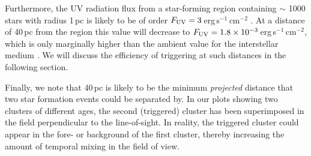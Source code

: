 \documentclass[useAMS,usenatbib,usegraphicx]{mn2e}
\begin{document}
Furthermore, the UV radiation flux from a star-forming region containing $\sim$ 1000 stars with radius 1\,pc is likely to be of order $F_{\rm UV} = 3$\,erg\,s$^{-1}$\,cm$^{-2}$ \citep{Fatuzzo08}. At a distance of 40\,pc from the region this value will decrease to $F_{\rm UV} = 1.8 \times 10^{-3}$\,erg\,s$^{-1}$\,cm$^{-2}$, which is only marginally higher than the ambient value for the interstellar medium \citep[$F_{\rm UV} = 1.6 \times 10^{-3}$\,erg\,s$^{-1}$\,cm$^{-2}$,][]{Habing68}. We will discuss the efficiency of triggering at such distances in the following section. 



Finally, we note that 40\,pc is likely to be the minimum \emph{projected} distance that two star formation events could be separated by. In our plots showing two clusters of different ages, the second (triggered) cluster has been superimposed in the field perpendicular to the line-of-sight. In reality, the triggered cluster could appear in the fore- or background of the first cluster, thereby increasing the amount of temporal mixing in the field of view.


\end{document}
